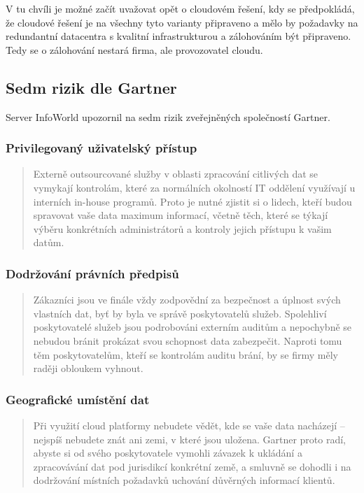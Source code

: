 V tu chvíli je možné začít uvažovat opět o cloudovém řešení, kdy se předpokládá, že cloudové řešení je na všechny tyto varianty připraveno a mělo by požadavky na redundantní datacentra s kvalitní infrastrukturou a zálohováním být připraveno. Tedy se o zálohování nestará firma, ale provozovatel cloudu.\nocite{podnikatel:zalohovani}


\subsection{Sedm rizik dle Gartner}
Server InfoWorld upozornil na sedm rizik zveřejněných společností Gartner. \cite{infoworld:7rizik}

\subsubsection{Privilegovaný uživatelský přístup}
\begin{quote}
Externě outsourcované služby v oblasti zpracování citlivých dat se vymykají kontrolám, které za normálních okolností IT oddělení využívají u interních in-house programů. Proto je nutné zjistit si o lidech, kteří budou spravovat vaše data maximum informací, včetně těch, které se týkají výběru konkrétních administrátorů a kontroly jejich přístupu k vašim datům.\cite{cloud.cz:7rizik}
\end{quote}

\subsubsection{Dodržování právních předpisů}
\begin{quote}
Zákazníci jsou ve finále vždy zodpovědní za bezpečnost a úplnost svých vlastních dat, byť by byla ve správě poskytovatelů služeb. Spolehliví poskytovatelé služeb jsou podrobováni externím auditům a nepochybně se nebudou bránit prokázat svou schopnost data zabezpečit. Naproti tomu těm poskytovatelům, kteří se kontrolám auditu brání, by se firmy měly raději obloukem vyhnout.\cite{cloud.cz:7rizik}
\end{quote}

\subsubsection{Geografické umístění dat}
\begin{quote}
Při využití cloud platformy nebudete vědět, kde se vaše data nacházejí – nejspíš nebudete znát ani zemi, v které jsou uložena. Gartner proto radí, abyste si od svého poskytovatele vymohli závazek k ukládání a zpracovávání dat pod jurisdikcí konkrétní země, a smluvně se dohodli i na dodržování místních požadavků uchování důvěrných informací klientů.\cite{cloud.cz:7rizik}
\end{quote}

